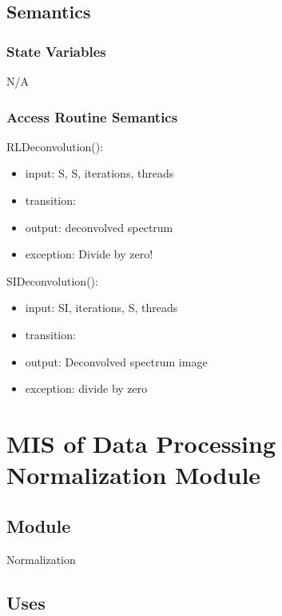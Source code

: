\documentclass[12pt, titlepage]{article}
\begin{document}
\subsection{Semantics}

\subsubsection{State Variables}
N/A

\subsubsection{Access Routine Semantics}

\noindent RLDeconvolution():
\begin{itemize}
\item input: S, S, iterations, threads
\item transition:  
\item output: deconvolved spectrum
\item exception: Divide by zero!
\end{itemize}

\noindent SIDeconvolution():
\begin{itemize}
\item input: SI, iterations, S, threads
\item transition: 
\item output: Deconvolved spectrum image
\item exception: divide by zero
\end{itemize}

\section{MIS of Data Processing Normalization Module} \label{Mod:Normalization} 

\subsection{Module}

Normalization

\subsection{Uses}
\end{document}
